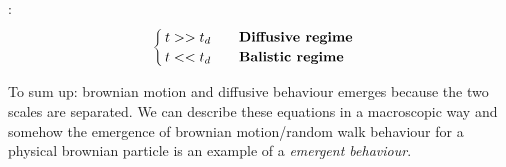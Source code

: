 \documentclass[\main/main.tex]{subfiles}
\begin{document}
: 
\[
\begin{cases}
  t>>t_d \qquad \text{\textbf{Diffusive regime}}\\
  t<<t_d \qquad \text{\textbf{Balistic regime}}
\end{cases}
\]

To sum up: brownian motion and diffusive behaviour emerges because the two scales are separated. We can describe these equations in a macroscopic way and somehow the emergence of brownian motion/random walk behaviour for a physical brownian particle is an example of a \textit{emergent behaviour}.
\end{document}
